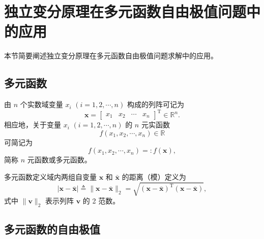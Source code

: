 \section{独立变分原理在多元函数自由极值问题中的应用}

本节简要阐述独立变分原理在多元函数自由极值问题求解中的应用。

\subsection{多元函数}

由 $n$ 个实数域变量 $x_i$ $(i = 1, 2, \cdots, n)$ 构成的列阵可记为
\begin{equation}\label{eq:1.7}
\boldsymbol{x} = \begin{bmatrix} x_1 & x_2 & \cdots & x_n \end{bmatrix}^{\mathrm{T}} \in \mathbb{R}^n.
\end{equation}
相应地，关于变量 $x_i$ $(i = 1, 2, \cdots, n)$ 的 $n$ 元实函数
\begin{equation}\label{eq:1.8}
f(x_1, x_2, \cdots, x_n) \in \mathbb{R}
\end{equation}
可简记为
\begin{equation}\label{eq:1.9}
f(x_1, x_2, \cdots, x_n) =: f(\boldsymbol{x}),
\end{equation}
简称 $n$ 元函数或多元函数。

多元函数定义域内两组自变量 $\boldsymbol{x}$ 和 $\bar{\boldsymbol{x}}$ 的距离（模）定义为
\begin{equation}\label{eq:1.10}
|\boldsymbol{x} - \bar{\boldsymbol{x}}| \triangleq \|\boldsymbol{x} - \bar{\boldsymbol{x}}\|_2 = \sqrt{(\boldsymbol{x} - \bar{\boldsymbol{x}})^{\mathrm{T}} (\boldsymbol{x} - \bar{\boldsymbol{x}})},
\end{equation}
式中 $\|\boldsymbol{v}\|_2$ 表示列阵 $\boldsymbol{v}$ 的 2 范数。

\subsection{多元函数的自由极值}

